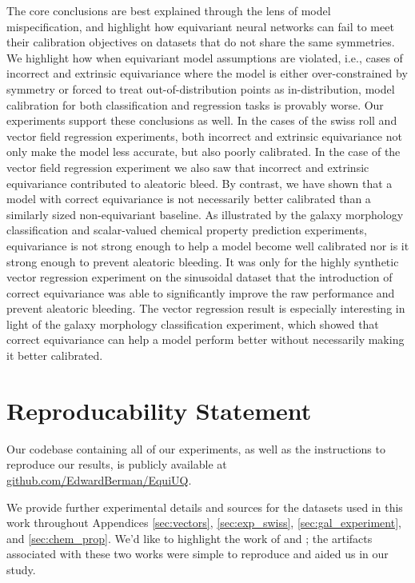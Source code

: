 \documentclass[10pt]{article} %
\theoremstyle{definition}
\begin{document}
The core conclusions are best explained through the lens of model mispecification, and highlight how equivariant neural networks can fail to meet their calibration objectives on datasets that do not share the same symmetries. We highlight how when equivariant model assumptions are violated, i.e., cases of incorrect and extrinsic equivariance where the model is either over-constrained by symmetry or forced to treat out-of-distribution points as in-distribution, model calibration for both classification and regression tasks is provably worse. Our experiments support these conclusions as well. In the cases of the swiss roll and vector field regression experiments, both incorrect and extrinsic equivariance not only make the model less accurate, but also poorly calibrated. In the case of the vector field regression experiment we also saw that incorrect and extrinsic equivariance contributed to aleatoric bleed. By contrast, we have shown that a model with correct equivariance is not necessarily better calibrated than a similarly sized non-equivariant baseline. As illustrated by the galaxy morphology classification and scalar-valued chemical property prediction experiments, equivariance is not strong enough to help a model become well calibrated nor is it strong enough to prevent aleatoric bleeding. It was only for the highly synthetic vector regression experiment on the sinusoidal dataset that the introduction of correct equivariance was able to significantly improve the raw performance and prevent aleatoric bleeding. The vector regression result is especially interesting in light of the galaxy morphology classification experiment, which showed that correct equivariance can help a model perform better without necessarily making it better calibrated.


\section{Reproducability Statement}

Our codebase containing all of our experiments, as well as the instructions to reproduce our results, is publicly available at \url{github.com/EdwardBerman/EquiUQ}. 

We provide further experimental details and sources for the datasets used in this work throughout Appendices \ref{sec:vectors}, \ref{sec:exp_swiss}, \ref{sec:gal_experiment}, and \ref{sec:chem_prop}. We'd like to highlight the work of \cite{wang2024general} and \cite{sneh_mlst}; the artifacts associated with these two works were simple to reproduce and aided us in our study.
\end{document}
